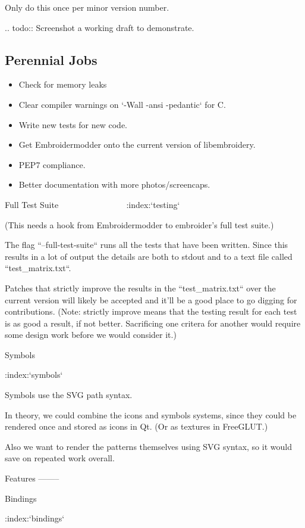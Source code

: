 \documentclass[a4paper]{report}
\begin{document}
{Only do this once per minor version number.

.. todo::
   Screenshot a working draft to demonstrate.

\subsection{Perennial Jobs}

\begin{itemize}
\item Check for memory leaks
\item Clear compiler warnings on `-Wall -ansi -pedantic` for C.
\item Write new tests for new code.
\item Get Embroidermodder onto the current version of libembroidery.
\item PEP7 compliance.
\item Better documentation with more photos/screencaps.
\end{itemize}

Full Test Suite
~~~~~~~~~~~~~~~
:index:`testing`

(This needs a hook from Embroidermodder to embroider's full test suite.)

The flag ``--full-test-suite`` runs all the tests that have been written.
Since this results in a lot of output the details are both to stdout
and to a text file called ``test_matrix.txt``.

Patches that strictly improve the results in the ``test_matrix.txt`` over
the current version will likely be accepted and it'll be a good place
to go digging for contributions. (Note: strictly improve means that
the testing result for each test is as good a result, if not better.
Sacrificing one critera for another would require some design work
before we would consider it.)

Symbols
~~~~~~~

:index:`symbols`

Symbols use the SVG path syntax.

In theory, we could combine the icons and symbols systems, since they could be
rendered once and stored as icons in Qt. (Or as textures in FreeGLUT.)

Also we want to render the patterns themselves using SVG syntax, so it would
save on repeated work overall.

Features
--------

Bindings
~~~~~~~~

:index:`bindings`

}
\end{document}
